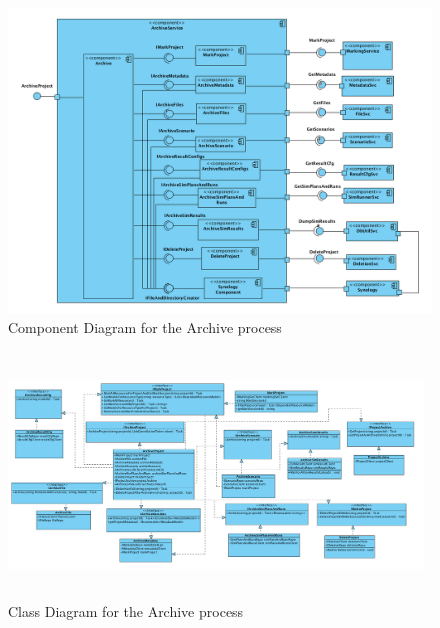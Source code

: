 \begin{figure}[H]
    \centering \includegraphics[scale=0.45]{grafiken/archiveComponent.png}
    \caption{Component Diagram for the Archive process}
    \label{fig:archiveComponent}
\end{figure}



\begin{figure}[H]
    \centering \includegraphics[height=6.5cm, angle=90, origin=c, width=11cm]{grafiken/archiveClassDiagram.png}
    \caption{Class Diagram for the Archive process}
    \label{fig:archiveClassDiagram}
\end{figure}